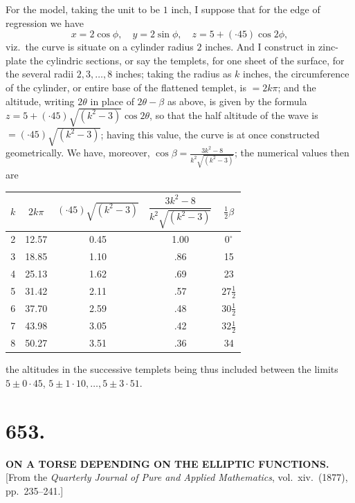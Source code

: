 \documentclass[11pt,a4paper]{article}
\begin{document}
For the model, taking the unit to be $1$ inch, I suppose that for the edge of regression we have
\[
x = 2\cos\phi,\quad y = 2\sin\phi,\quad z = 5 + (\cdot 45)\cos 2\phi,
\]
viz.\ the curve is situate on a cylinder radius $2$ inches. And I construct in zinc-plate the cylindric sections, or say the templets, for one sheet of the surface, for the several radii $2, 3, \ldots, 8$ inches; taking the radius as $k$ inches, the circumference of the cylinder, or entire base of the flattened templet, is $= 2k\pi$; and the altitude, writing $2\theta$ in place of $2\theta - \beta$ as above, is given by the formula $z = 5 + (\cdot 45) \sqrt{(k^2 - 3)} \cos 2\theta$, so that the half altitude of the wave is $= (\cdot 45) \sqrt{(k^2 - 3)}$; having this value, the curve is at once constructed geometrically. We have, moreover, $\cos\beta = \frac{3k^2 - 8}{k^2 \sqrt{(k^2 - 3)}}$; the numerical values then are
\begin{center}
\begin{tabular}{ccccc}
$k$ & $2k\pi$ & $(\cdot 45)\sqrt{(k^2 - 3)}$ & $\dfrac{3k^2 - 8}{k^2\sqrt{(k^2 - 3)}}$ & $\tfrac{1}{2}\beta$ \\
\hline
2 & 12.57 & 0.45 & 1.00 & $0^\circ$ \\
3 & 18.85 & 1.10 & .86 & 15 \\
4 & 25.13 & 1.62 & .69 & 23 \\
5 & 31.42 & 2.11 & .57 & $27\tfrac{1}{2}$ \\
6 & 37.70 & 2.59 & .48 & $30\tfrac{1}{2}$ \\
7 & 43.98 & 3.05 & .42 & $32\tfrac{1}{2}$ \\
8 & 50.27 & 3.51 & .36 & 34 \\
\end{tabular}
\end{center}
the altitudes in the successive templets being thus included between the limits $5 \pm 0\cdot 45$, $5 \pm 1\cdot 10, \ldots, 5 \pm 3\cdot 51$.

\bigskip


\section*{653.}

\begin{center}
\textbf{ON A TORSE DEPENDING ON THE ELLIPTIC FUNCTIONS.}\\[1em]
[From the \textit{Quarterly Journal of Pure and Applied Mathematics}, vol.~xiv.\ (1877), pp.~235--241.]
\end{center}
\end{document}
